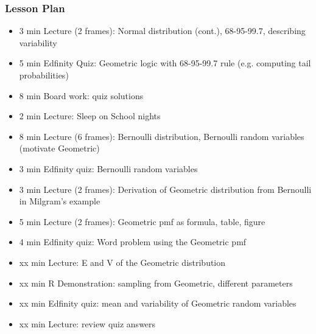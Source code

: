 \begin{frame}
    \frametitle{Lesson Plan}
    \begin{itemize}
        \item 3 min Lecture (2 frames): Normal distribution (cont.), 68-95-99.7, describing variability
        \item 5 min Edfinity Quiz: Geometric logic with 68-95-99.7 rule (e.g. computing tail probabilities)
        \item 8 min Board work: quiz solutions
        \item 2 min Lecture: Sleep on School nights

        \item 8 min Lecture (6 frames): Bernoulli distribution, Bernoulli random variables (motivate Geometric)
        \item 3 min Edfinity quiz: Bernoulli random variables
        \item 3 min Lecture (2 frames): Derivation of Geometric distribution from Bernoulli in Milgram's example
        \item 5 min Lecture (2 frames): Geometric pmf as formula, table, figure
        \item 4 min Edfinity quiz: Word problem using the Geometric pmf
        
        \item xx min Lecture: E and V of the Geometric distribution
        \item xx min R Demonstration: sampling from Geometric, different parameters
        \item xx min Edfinity quiz: mean and variability of Geometric random variables
        \item xx min Lecture: review quiz answers
    \end{itemize}
\end{frame}


